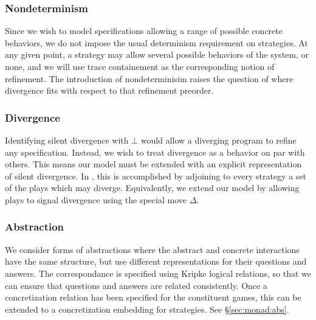 \documentclass[acmsmall,timestamp,review,anonymous]{acmart}
\begin{document}

\subsubsection{Nondeterminism} %

Since we wish to model specifications
allowing a range of possible concrete behaviors,
we do not impose
the usual determinism requirement on strategies.
At any given point,
a strategy may allow several possible behaviors
of the system, or none,
and we will use trace containement as
the corresponding notion of refinement.
The introduction of nondeterminisim raises the question of
where divergence fits with respect to that refinement preorder.


\subsubsection{Divergence} %

Identifying silent divergence with $\bot$
would allow a diverging program to refine any specification.
Instead,
we wish to treat divergence as a behavior on par with others.
This means our model must be extended
with an explicit representation of silent divergence.
In \cite{gsnondet},
this is accomplished by adjoining to every strategy
a set of the plays which may diverge.
Equivalently,
we extend our model by allowing plays to
signal divergence using
the special move $\Delta$.



\subsubsection{Abstraction} %

We consider forms of abstractions where
the abstract and concrete interactions have the same structure,
but use different representations for their questions and answers.
The correspondance is specified
using Kripke logical relations,
so that we can ensure that questions and answers are related consistently.
Once a concretization relation has been specified
for the constituent games,
this can be extended to a concretization embedding for strategies.
See \S\ref{sec:monad:abs}.

\end{document}
